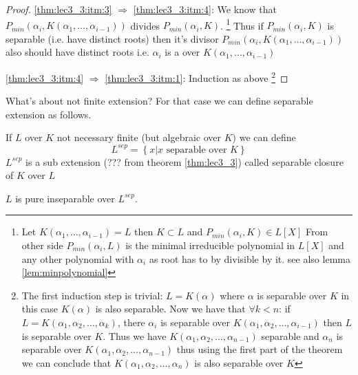 \begin{theorem}
\begin{proof}
    \ref{thm:lec3_3:itm:3} $\Rightarrow$ \ref{thm:lec3_3:itm:4}:
    We know that
    $P_{min}\left(\alpha_i, K\left(\alpha_1, \dots,
    \alpha_{i-1}\right)\right)$ divides
    $P_{min}\left(\alpha_i, K\right)$.
    \footnote{
      Let $K\left(\alpha_1, \dots, \alpha_{i-1}\right) = L$
      then $K \subset L$ and
      $P_{min}\left(\alpha_i, K\right) \in L\left[ X \right]$
      From other side $P_{min}\left(\alpha_i, L\right)$ is the minimal
      irreducible polynomial  in $L\left[X\right]$ and any other
      polynomial with $\alpha_i$ as root has to by divisible by it.
      see also lemma \ref{lem:minpolynomial}
    }
    Thus if 
    $P_{min}\left(\alpha_i, K\right)$ is separable (i.e. have distinct
    roots) then it's divisor $P_{min}\left(\alpha_i, K\left(\alpha_1, \dots,
    \alpha_{i-1}\right)\right)$ also should have distinct roots i.e.
    $\alpha_i$ is a  over
    $K\left(\alpha_1, \dots,\alpha_{i-1}\right)$
    
    \ref{thm:lec3_3:itm:4} $\Rightarrow$ \ref{thm:lec3_3:itm:1}:
    Induction as above
    \footnote{
      The first induction step is trivial: $L=K\left(\alpha\right)$
      where $\alpha$ is separable over $K$ in this case
      $K\left(\alpha\right)$ is also separable.
      Now we have that $\forall k < n$:
      if $L = K\left(\alpha_1, \alpha_2, \dots, \alpha_k\right)$, there
      $\alpha_i$ is separable over
      $K\left(\alpha_1, \alpha_2, \dots, \alpha_{i-1}\right)$ then $L$
      is separable over $K$. Thus we have
      $K\left(\alpha_1, \alpha_2, \dots, \alpha_{n-1}\right)$
      separable and $\alpha_n$ is separable over $K\left(\alpha_1,
      \alpha_2, \dots, \alpha_{n-1}\right)$ thus using the first part
      of the theorem we can conclude that 
      $K\left(\alpha_1, \alpha_2, \dots, \alpha_{n}\right)$ is also
      separable over $K$
    }    
  \end{proof}
\end{theorem}

What's about not finite extension? For that case we can define
separable extension as follows.
\begin{definition}
  If $L$ over $K$ not necessary finite (but algebraic over $K$) we can
  define
  \[
  L^{sep} = \left\{x \vert x \mbox{ separable over } K \right\}
  \]
  $L^{sep}$ is a sub extension (??? from theorem \ref{thm:lec3_3})
  called separable closure of $K$ over
  $L$
  \label{def:separableclosure}
\end{definition}
$L$ is pure inseparable over $L^{sep}$.

